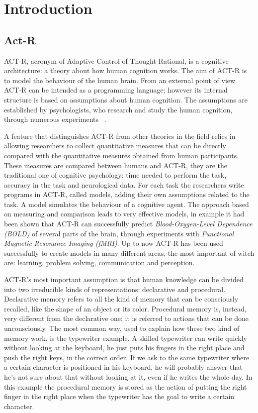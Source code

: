 \chapter{Introduction}
\section{Act-R}


ACT-R, acronym of Adaptive Control of Thought-Rational, is a cognitive architecture: a theory about how human cognition works. 
The aim of ACT-R is to model the behaviour of the human brain. From an external point of view ACT-R can be intended as a programming language; however its internal structure is based on assumptions about human cognition. The assumptions are established by psychologists, who research and study the human cognition, through numerous experiments ~\cite{Allen94}. 

A feature that distinguishes ACT-R from other theories in the field relies in allowing researchers to collect quantitative measures that can be directly compared with the quantitative measures obtained from human participants. These measures are compared between humans and ACT-R, they are the traditional one of cognitive psychology: time needed to perform the task, accuracy in the task and neurological data. For each task the researchers write programs in ACT-R, called models, adding their own assumptions related to the task. A model simulates the behaviour of a cognitive agent. The approach based on measuring and comparison leads to very effective models, in example it had been shown that ACT-R can successfully predict \emph{Blood-Oxygen-Level Dependence (BOLD)} of several parts of the brain, through experiments with \emph{Functional Magnetic Resonance Imaging (fMRI)}.
Up to now ACT-R has been used successfully to create models in many different areas, the most important of witch are: learning, problem solving, communication and perception.

ACT-R's most important assumption is that human knowledge can be divided into two irreducible kinds of representations: declarative and procedural.
Declarative memory refers to all the kind of memory that can be consciously recalled, like the shape of an object or its color. Procedural memory is, instead, very different from the declarative one: it is referred to actions that can be done unconsciously. The most common way, used to explain how these two kind of memory work, is the typewriter example.
A skilled typewriter can write quickly without looking at the keyboard, he just puts his fingers in the right place and push the right keys, in the correct order. If we ask to the same typewriter where a certain character is positioned in his keyboard, he will probably answer that he's not sure about that without looking at it, even if he writes the whole day. In this example the procedural memory is stored as the action of putting the right finger in the right place when the typewriter has the goal to write a certain character.

